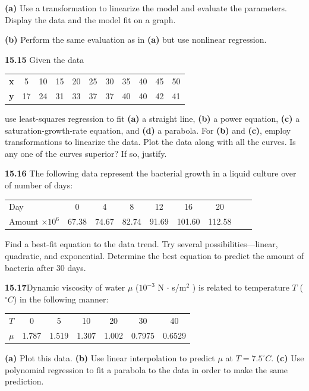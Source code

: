 \documentclass[../main.tex]{subfiles}
\begin{document}
\begin{multicols}{2}
	\noindent \textbf{(a)} Use a transformation to linearize the model and evaluate
the parameters. Display the data and the model fit on a
graph.

\noindent \textbf{(b)} Perform the same evaluation as in \textbf{(a)} but use nonlinear
regression.
 
	\noindent\textbf{15.15} Given the data

	\begin{tabular}{l c c c c c c c c c c }
		\textbf{x} & 5 & 10 & 15 & 20 & 25 & 30 & 35 & 40 & 45 & 50 \\
		\textbf{y} & 17 & 24 & 31 & 33 & 37 & 37 & 40 & 40 & 42 & 41
	\end{tabular}

	\noindent use least-squares regression to fit \textbf{(a)} a straight line, \textbf{(b)} a
	power equation, \textbf{(c)} a saturation-growth-rate equation, and
	\textbf{(d)} a parabola. For \textbf{(b)} and \textbf{(c)}, employ transformations to
	linearize the data. Plot the data along with all the curves. Is
	any one of the curves superior? If so, justify.

	\noindent\textbf{15.16} The following data represent the bacterial growth in a
	liquid culture over of number of days:

	\begin{tabular}{l c c c c c c c c}
		Day & 0 & 4 & 8 & 12 & 16 & 20 \\
		Amount $\times 10^6$ & 67.38 & 74.67 & 82.74 & 91.69 & 101.60 & 112.58
	\end{tabular}

	\noindent Find a best-fit equation to the data trend. Try several
	possibilities—linear, quadratic, and exponential. Determine
   the best equation to predict the amount of bacteria after
   30 days.

   \noindent\textbf{15.17}Dynamic viscosity of water $\mu$ ($10^{-3}$ N $\cdot $ s/m$^2$ ) is related to temperature $T$ ($^\circ C$) in the following manner:

	\noindent
	\begin{tabular}{l c c c c c c}
		$T$ &	0 &	5 &	10 &	20 &	30 &	40 \\
		$\mu$ & 1.787 & 1.519 & 1.307 &	1.002 &	0.7975 & 0.6529
	\end{tabular}
  
	\noindent \textbf{(a)} Plot this data.
	\noindent \textbf{(b)} Use linear interpolation to predict $\mu$ at $T = 7.5 ^\circ C$.
	\noindent \textbf{(c)} Use polynomial regression to fit a parabola to the data in
order to make the same prediction.


\end{multicols}
\end{document}
